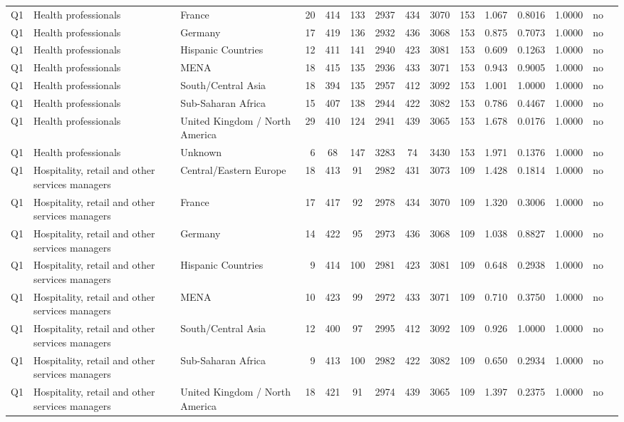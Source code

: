 \begin{longtable}{lllrcccccccccll}
Q1 & Health professionals & France & 20 & 414 & 133 & 2937 & 434 & 3070 & 153 & 1.067 & 0.8016 & 1.0000 & no \\
Q1 & Health professionals & Germany & 17 & 419 & 136 & 2932 & 436 & 3068 & 153 & 0.875 & 0.7073 & 1.0000 & no \\
Q1 & Health professionals & Hispanic Countries & 12 & 411 & 141 & 2940 & 423 & 3081 & 153 & 0.609 & 0.1263 & 1.0000 & no \\
Q1 & Health professionals & MENA & 18 & 415 & 135 & 2936 & 433 & 3071 & 153 & 0.943 & 0.9005 & 1.0000 & no \\
Q1 & Health professionals & South/Central Asia & 18 & 394 & 135 & 2957 & 412 & 3092 & 153 & 1.001 & 1.0000 & 1.0000 & no \\
Q1 & Health professionals & Sub-Saharan Africa & 15 & 407 & 138 & 2944 & 422 & 3082 & 153 & 0.786 & 0.4467 & 1.0000 & no \\
Q1 & Health professionals & United Kingdom / North America & 29 & 410 & 124 & 2941 & 439 & 3065 & 153 & 1.678 & 0.0176 & 1.0000 & no \\
Q1 & Health professionals & Unknown & 6 & 68 & 147 & 3283 & 74 & 3430 & 153 & 1.971 & 0.1376 & 1.0000 & no \\
Q1 & Hospitality, retail and other services managers & Central/Eastern Europe & 18 & 413 & 91 & 2982 & 431 & 3073 & 109 & 1.428 & 0.1814 & 1.0000 & no \\
Q1 & Hospitality, retail and other services managers & France & 17 & 417 & 92 & 2978 & 434 & 3070 & 109 & 1.320 & 0.3006 & 1.0000 & no \\
Q1 & Hospitality, retail and other services managers & Germany & 14 & 422 & 95 & 2973 & 436 & 3068 & 109 & 1.038 & 0.8827 & 1.0000 & no \\
Q1 & Hospitality, retail and other services managers & Hispanic Countries & 9 & 414 & 100 & 2981 & 423 & 3081 & 109 & 0.648 & 0.2938 & 1.0000 & no \\
Q1 & Hospitality, retail and other services managers & MENA & 10 & 423 & 99 & 2972 & 433 & 3071 & 109 & 0.710 & 0.3750 & 1.0000 & no \\
Q1 & Hospitality, retail and other services managers & South/Central Asia & 12 & 400 & 97 & 2995 & 412 & 3092 & 109 & 0.926 & 1.0000 & 1.0000 & no \\
Q1 & Hospitality, retail and other services managers & Sub-Saharan Africa & 9 & 413 & 100 & 2982 & 422 & 3082 & 109 & 0.650 & 0.2934 & 1.0000 & no \\
Q1 & Hospitality, retail and other services managers & United Kingdom / North America & 18 & 421 & 91 & 2974 & 439 & 3065 & 109 & 1.397 & 0.2375 & 1.0000 & no \\

\end{longtable}
